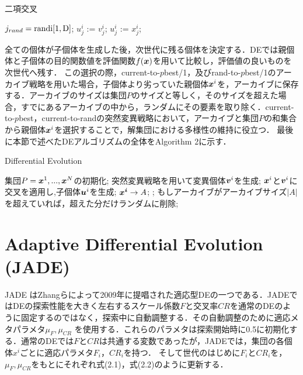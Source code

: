 \documentclass[a4paper,11pt,oneside,openany]{jsbook}
\def\vector#1{\mbox{\boldmath $#1$}}
\begin{document}
\begin{algorithm}
\caption{二項交叉}
\label{alg:pbnf}
\begin{algorithmic}
\STATE $j_{rand} = \rm{randi}[1, D]$;
  \IF {$\rm{rand}[0,1) \leqq $ \OR $j == j_{rand} $}
    \STATE $u^i_j$ := $v^i_j$;
  \ELSE
    \STATE $u^i_j$ := $x^i_j$;
  \ENDIF
\ENDFOR
\end{algorithmic}
\end{algorithm}
全ての個体が子個体を生成した後，次世代に残る個体を決定する．DEでは親個体と子個体の目的関数値を評価関数$f(\vector{x})$を用いて比較し，評価値の良いものを次世代へ残す．
この選択の際，current-to-$p$best/1，及びrand-to-$p$best/1のアーカイブ戦略を用いた場合，子個体より劣っていた親個体$\vector{x}^i$を，アーカイブに保存する．アーカイブのサイズは集団$P$のサイズと等しく，そのサイズを超えた場合，すでにあるアーカイブの中から，ランダムにその要素を取り除く．current-to-$p$best，current-to-randの突然変異戦略において，アーカイブと集団$P$の和集合から親個体$\vector{x}^i$を選択することで，解集団における多様性の維持に役立つ．
最後に本節で述べたDEアルゴリズムの全体をAlgorithm 2に示す．

\begin{algorithm}
\caption{Differential Evolution}
\label{alg:pbnf}
\begin{algorithmic}
\STATE 集団$P={\vector{x}^1,...,\vector{x}^N}$の初期化;
        \STATE 突然変異戦略を用いて変異個体{$\vector{v}^i$}を生成;
        \STATE $\vector{x}^i$と$\vector{v}^i$に交叉を適用し,子個体$\vector{u}^i$を生成;
    \ENDFOR
        \IF {$f(\vector{u}^i) \leqq f(\vector{x}^i)$}
            \STATE $\vector{x^i} \rightarrow {A}$;
            \STATE {$\vector{x}^i :=\vector{u}^i$};
        \ENDIF
    \ENDFOR
    \STATE もしアーカイブがアーカイブサイズ$|A|$を超えていれば，超えた分だけランダムに削除;
\ENDWHILE
\end{algorithmic}
\end{algorithm}


\section{Adaptive Differential Evolution (JADE)}
JADE \cite{JADE} はZhangらによって2009年に提唱された適応型DEの一つである．JADEではDEの探索性能を大きく左右するスケール係数$F$と交叉率$CR$を通常のDEのように固定するのではなく，探索中に自動調整する．その自動調整のために適応メタパラメタ$\mu _F,\mu _{CR}$ を使用する．これらのパラメタは探索開始時に0.5に初期化する．通常のDEでは$F$と$CR$は共通する変数であったが，JADEでは，集団の各個体\vector{x^i}ごとに適応パラメタ$F_i$，$CR_i$を持つ．
そして世代のはじめに$F_i$と$CR_i$を，$\mu _F,\mu _{CR}$をもとにそれぞれ式(2.1)，式(2.2)のように更新する．
\end{document}
